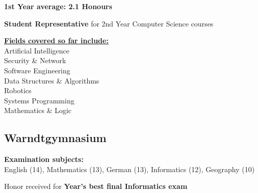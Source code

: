 \documentclass[]{jonas-cv}
\begin{document}
\begin{minipage}[t]{0.33\textwidth}
\begin{tightemize}
    \item \textbf{1st Year average: 2.1 Honours}
    \item \textbf{Student Representative} for 2nd Year Computer Science courses
    \item \textbf{\underline{Fields covered so far include:}}\\
    Artificial Intelligence \\
    Security \& Network \\
    Software Engineering \\
    Data Structures \& Algorithms \\
    Robotics \\
    Systems Programming \\
    Mathematics \& Logic
\end{tightemize}
\largesectionsep


\subsection{Warndtgymnasium}

\begin{tightemize}
    \item \textbf{Examination subjects:}\\
             English (14), Mathematics (13), German (13), Informatics (12), Geography (10)
    \item Honor received for \textbf{Year's best final Informatics exam}
\end{tightemize}
\largesectionsep
\vspace{-0.5mm}

%
%

\end{minipage} 
\hspace{1.5mm}
\vrule %
\hspace{1.5mm}
\end{document}
